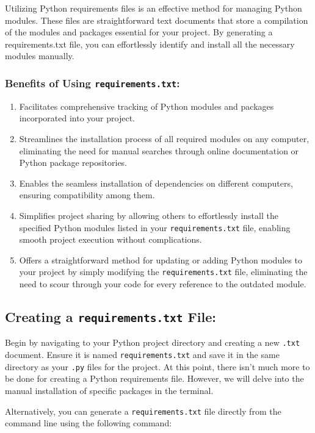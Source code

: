 Utilizing Python requirements files is an effective method for managing Python modules. These files are straightforward text documents that store a compilation of the modules and packages essential for your project. By generating a requirements.txt file, you can effortlessly identify and install all the necessary modules manually.


\subsubsection{Benefits of Using \texttt{requirements.txt}:}

\begin{enumerate}
	\item Facilitates comprehensive tracking of Python modules and packages incorporated into your project.
	\item Streamlines the installation process of all required modules on any computer, eliminating the need for manual searches through online documentation or Python package repositories.
	\item Enables the seamless installation of dependencies on different computers, ensuring compatibility among them.
	\item Simplifies project sharing by allowing others to effortlessly install the specified Python modules listed in your \texttt{requirements.txt} file, enabling smooth project execution without complications.
	\item Offers a straightforward method for updating or adding Python modules to your project by simply modifying the \texttt{requirements.txt} file, eliminating the need to scour through your code for every reference to the outdated module.
\end{enumerate}

\subsection{Creating a \texttt{requirements.txt} File:}

Begin by navigating to your Python project directory and creating a new \texttt{.txt} document. Ensure it is named \texttt{requirements.txt} and save it in the same directory as your \texttt{.py} files for the project. At this point, there isn't much more to be done for creating a Python requirements file. However, we will delve into the manual installation of specific packages in the terminal.

Alternatively, you can generate a \texttt{requirements.txt} file directly from the command line using the following command:

